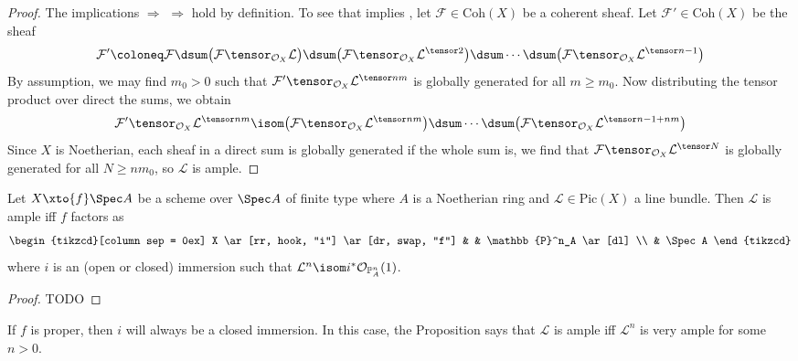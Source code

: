 \documentclass[wip, algebra]{bsteffan-lecturenotes}
\newcommand{\cO}{\mathcal{O}}
\newcommand{\cF}{\mathcal{F}}
\newcommand{\cL}{\mathcal{L}}
\renewcommand{\P}{\mathbb{P}}
\newcommand{\Pic}{\mathrm{Pic}}
\newcommand{\Coh}{\mathrm{Coh}}
\begin{document}
\begin{proof}
	The implications  $\Rightarrow$  $\Rightarrow$  hold by definition.
	To see that  implies , let $\cF \in \Coh(X)$ be a coherent sheaf.
	Let $\cF' \in \Coh(X)$ be the sheaf
	\begin{equation*}
		\cF' \coloneq \cF \dsum \big(\cF \tensor_{\cO_X} \cL\big) \dsum \big(\cF \tensor_{\cO_X} \cL^{\tensor 2}\big) \dsum \cdots \dsum \big(\cF \tensor_{\cO_X} \cL^{\tensor n - 1}\big)
	\end{equation*}
	By assumption, we may find $m_0 > 0$ such that $\cF' \tensor_{\cO_X} \cL^{\tensor nm}$ is globally generated for all $m \geq m_0$.
	Now distributing the tensor product over direct the sums, we obtain
	\begin{equation*}
		\cF' \tensor_{\cO_X} \cL^{\tensor nm} \isom \big(\cF \tensor_{\cO_X} \cL^{\tensor nm}\big) \dsum \cdots \dsum \big(\cF \tensor_{\cO_X} \cL^{\tensor n - 1 + nm}\big)
	\end{equation*}
	Since $X$ is Noetherian, each sheaf in a direct sum is globally generated if the whole sum is, we find that $\cF \tensor_{\cO_X} \cL^{\tensor N}$ is globally generated for all $N \geq n m_0$, so $\cL$ is ample.
\end{proof}
\begin{proposition}
	Let $X \xto{f} \Spec A$ be a scheme over $\Spec A$ of finite type where $A$ is a Noetherian ring and $\cL \in \Pic(X)$ a line bundle.
	Then $\cL$ is ample iff $f$ factors as 
	\begin{equation*}
		\begin{tikzcd}[column sep = 0ex]
			X
					\ar[rr, hook, "i"]
					\ar[dr, swap, "f"]
				& & \P^n_A
					\ar[dl]
			\\
				& \Spec A
		\end{tikzcd}
	\end{equation*}
	where $i$ is an (open or closed) immersion such that $\cL^n \isom i^* \cO_{\P^n_A}(1)$.
\end{proposition}
\begin{proof}
	TODO
\end{proof}
\begin{remark}
	If $f$ is proper, then $i$ will always be a closed immersion.
	In this case, the Proposition says that $\cL$ is ample iff $\cL^n$ is very ample for some $n > 0$. 
\end{remark}
\end{document}
